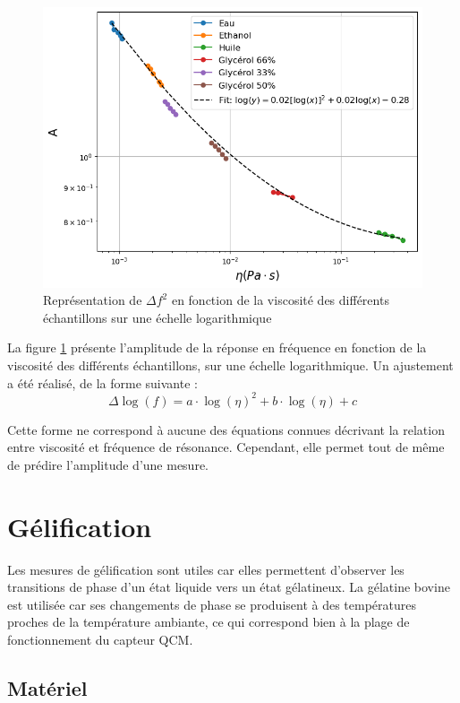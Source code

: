 \begin{figure}[H]
    \centering
    \includegraphics[width=\textwidth]{assets/figures/loglog.png}
    \caption{Représentation de $\Delta f^2$ en fonction de la viscosité des différents échantillons sur une échelle logarithmique}
    \label{fig:loglog}
\end{figure}

La figure \ref{fig:loglog} présente l’amplitude de la réponse en fréquence en fonction de la viscosité des différents échantillons, sur une échelle logarithmique.  
Un ajustement a été réalisé, de la forme suivante :
\begin{equation}
    \Delta \log(f) = a \cdot \log(\eta)^2 + b \cdot \log(\eta) + c
\end{equation}

Cette forme ne correspond à aucune des équations connues décrivant la relation entre viscosité et fréquence de résonance.  
Cependant, elle permet tout de même de prédire l’amplitude d’une mesure.

\section{Gélification}

Les mesures de gélification sont utiles car elles permettent d'observer les transitions de phase d’un état liquide vers un état gélatineux. La gélatine bovine est utilisée car ses changements de phase se produisent à des températures proches de la température ambiante, ce qui correspond bien à la plage de fonctionnement du capteur QCM.

\subsection{Matériel}

